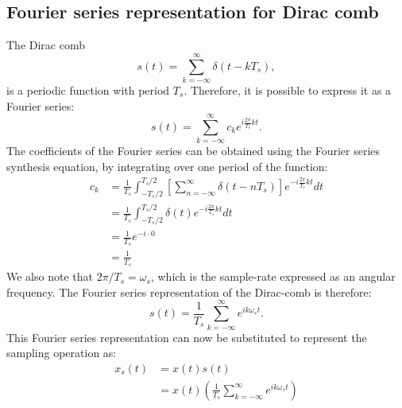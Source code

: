 \subsection{Fourier series representation for Dirac comb}
The Dirac comb
\begin{equation}
  s(t) = \sum_{k=-\infty}^{\infty} \delta(t-kT_s),
\end{equation}
is a periodic function with period $T_s$. Therefore, it is possible to express it as a Fourier series:
\begin{equation}
  s(t) = \sum_{k=-\infty}^{\infty} c_k e^{i\frac{2\pi}{T_s}kt}.
\end{equation}
The coefficients of the Fourier series can be obtained using the Fourier series synthesis equation, 
by integrating over one period of the function:
\begin{align}
  c_k & = \frac{1}{T_s}\int_{-T_s/2}^{T_s/2} \left[\sum_{n=-\infty}^{\infty} \delta(t-nT_s) \right] e^{-i\frac{2\pi}{T_s}kt}dt \\
      & =\frac{1}{T_s}\int_{-T_s/2}^{T_s/2} \delta(t)  e^{-i\frac{2\pi}{T_s}kt}dt                                              \\
      & =\frac{1}{T_s}e^{-i\cdot 0}                                                                                            \\
      & =\frac{1}{T_s}
\end{align}
We also note that $2\pi/T_s = \omega_s$, which is the sample-rate expressed as an angular frequency. 
The Fourier series representation of the Dirac-comb is therefore:
\begin{equation}
  s(t) = \frac{1}{T_s}\sum_{k=-\infty}^{\infty} e^{i k \omega_s t}.
\end{equation}
This Fourier series representation can now be substituted to represent the sampling operation as:
\begin{align}
  x_s(t) & = x(t)s(t)                                                                     \\
         & = x(t)  \left(\frac{1}{T_s}\sum_{k=-\infty}^{\infty} e^{i k \omega_s t}\right)
\end{align}

